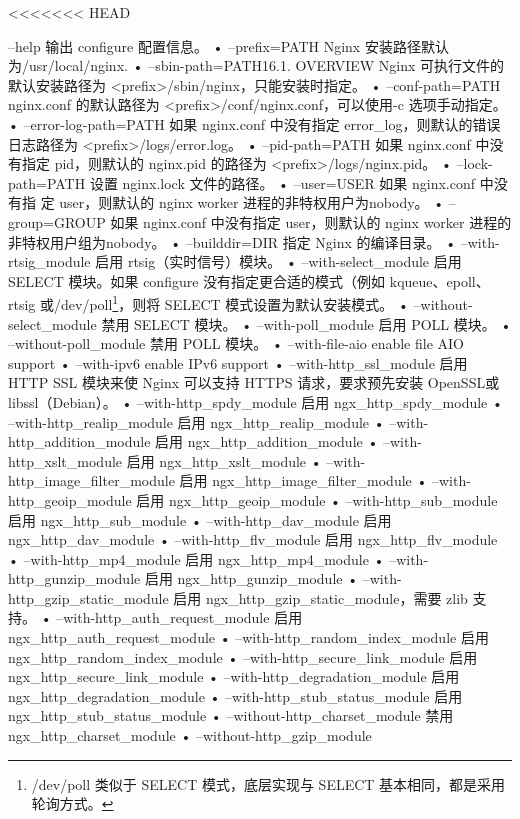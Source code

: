 \begin{compactitem}
<<<<<<< HEAD
\item --help
输出 configure 配置信息。
• --prefix=PATH 
Nginx 安装路径默认为/usr/local/nginx.
• --sbin-path=PATH16.1. OVERVIEW
Nginx 可执行文件的默认安装路径为 <prefix>/sbin/nginx，只能安装时指定。
• --conf-path=PATH
nginx.conf 的默认路径为 <prefix>/conf/nginx.conf，可以使用-c 选项手动指定。
• --error-log-path=PATH
如果 nginx.conf 中没有指定 error_log，则默认的错误日志路径为 <prefix>/logs/error.log。
• --pid-path=PATH
如果 nginx.conf 中没有指定 pid，则默认的 nginx.pid 的路径为 <prefix>/logs/nginx.pid。
• --lock-path=PATH
设置 nginx.lock 文件的路径。
• --user=USER
如果 nginx.conf 中没 有指 定 user，则默认的 nginx worker 进程的非特权用户为nobody。
• --group=GROUP
如果 nginx.conf 中没有指定 user，则默认的 nginx worker 进程的非特权用户组为nobody。
• --builddir=DIR
指定 Nginx 的编译目录。
• --with-rtsig_module
启用 rtsig（实时信号）模块。
• --with-select_module
启用 SELECT 模块。如果 configure 没有指定更合适的模式（例如 kqueue、epoll、rtsig 或/dev/poll\footnote{/dev/poll 类似于 SELECT 模式，底层实现与 SELECT 基本相同，都是采用轮询方式。}，则将 SELECT 模式设置为默认安装模式。
• --without-select_module
禁用 SELECT 模块。
• --with-poll_module
启用 POLL 模块。
• --without-poll_module
禁用 POLL 模块。
• --with-file-aio enable file AIO support
• --with-ipv6 enable IPv6 support
• --with-http_ssl_module
启用 HTTP SSL 模块来使 Nginx 可以支持 HTTPS 请求，要求预先安装 OpenSSL或libssl（Debian）。
• --with-http_spdy_module
启用 ngx_http_spdy_module
• --with-http_realip_module
启用 ngx_http_realip_module
• --with-http_addition_module
启用 ngx_http_addition_module
• --with-http_xslt_module
启用 ngx_http_xslt_module
• --with-http_image_filter_module
启用 ngx_http_image_filter_module
• --with-http_geoip_module
启用 ngx_http_geoip_module
• --with-http_sub_module
启用 ngx_http_sub_module
• --with-http_dav_module
启用 ngx_http_dav_module
• --with-http_flv_module
启用 ngx_http_flv_module
• --with-http_mp4_module
启用 ngx_http_mp4_module
• --with-http_gunzip_module
启用 ngx_http_gunzip_module
• --with-http_gzip_static_module
启用 ngx_http_gzip_static_module，需要 zlib 支持。
• --with-http_auth_request_module
启用 ngx_http_auth_request_module
• --with-http_random_index_module
启用 ngx_http_random_index_module
• --with-http_secure_link_module
启用 ngx_http_secure_link_module
• --with-http_degradation_module
启用 ngx_http_degradation_module
• --with-http_stub_status_module
启用 ngx_http_stub_status_module
• --without-http_charset_module
禁用 ngx_http_charset_module
• --without-http_gzip_module

\end{compactitem}
